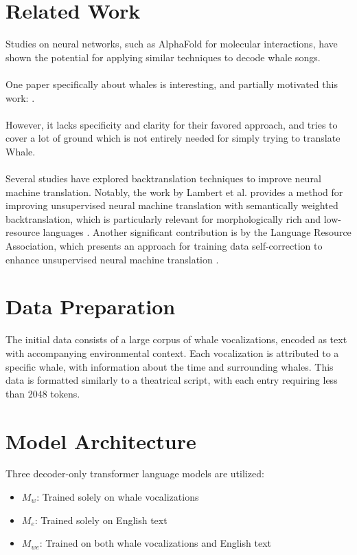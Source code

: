 \documentclass{article}
\begin{document}
\section{Related Work}
Studies on neural networks, such as AlphaFold for molecular interactions, have shown the potential for applying similar techniques to decode whale songs. \\ \\
One paper specifically about whales is interesting, and partially motivated this work: \cite{animalcommunication}. \\ \\
However, it lacks specificity and clarity for their favored approach, and tries to cover a lot of ground which is not entirely needed for simply trying to translate Whale.\\ \\
Several studies have explored backtranslation techniques to improve neural machine translation. Notably, the work by Lambert et al. provides a method for improving unsupervised neural machine translation with semantically weighted backtranslation, which is particularly relevant for morphologically rich and low-resource languages \cite{backtranslation1}. Another significant contribution is by the Language Resource Association, which presents an approach for training data self-correction to enhance unsupervised neural machine translation \cite{backtranslation2}.


\section{Data Preparation}
The initial data consists of a large corpus of whale vocalizations, encoded as text with accompanying environmental context. Each vocalization is attributed to a specific whale, with information about the time and surrounding whales. This data is formatted similarly to a theatrical script, with each entry requiring less than 2048 tokens.

\section{Model Architecture}
Three decoder-only transformer language models are utilized:

\begin{itemize}
    \item $M_w$: Trained solely on whale vocalizations
    \item $M_e$: Trained solely on English text
    \item $M_{we}$: Trained on both whale vocalizations and English text
\end{itemize}
\end{document}
